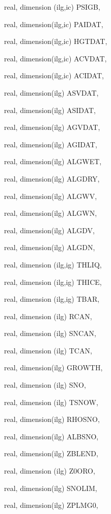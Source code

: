{\begin{DoxyParamCaption}
\item[{real, dimension (ilg,ic)}]{P\+S\+I\+G\+B, }
\item[{real, dimension(ilg,ic)}]{P\+A\+I\+D\+A\+T, }
\item[{real, dimension(ilg,ic)}]{H\+G\+T\+D\+A\+T, }
\item[{real, dimension(ilg,ic)}]{A\+C\+V\+D\+A\+T, }
\item[{real, dimension(ilg,ic)}]{A\+C\+I\+D\+A\+T, }
\item[{real, dimension(ilg)}]{A\+S\+V\+D\+A\+T, }
\item[{real, dimension(ilg)}]{A\+S\+I\+D\+A\+T, }
\item[{real, dimension(ilg)}]{A\+G\+V\+D\+A\+T, }
\item[{real, dimension(ilg)}]{A\+G\+I\+D\+A\+T, }
\item[{real, dimension(ilg)}]{A\+L\+G\+W\+E\+T, }
\item[{real, dimension(ilg)}]{A\+L\+G\+D\+R\+Y, }
\item[{real, dimension(ilg)}]{A\+L\+G\+W\+V, }
\item[{real, dimension(ilg)}]{A\+L\+G\+W\+N, }
\item[{real, dimension(ilg)}]{A\+L\+G\+D\+V, }
\item[{real, dimension(ilg)}]{A\+L\+G\+D\+N, }
\item[{real, dimension (ilg,ig)}]{T\+H\+L\+I\+Q, }
\item[{real, dimension (ilg,ig)}]{T\+H\+I\+C\+E, }
\item[{real, dimension  (ilg,ig)}]{T\+B\+A\+R, }
\item[{real, dimension  (ilg)}]{R\+C\+A\+N, }
\item[{real, dimension (ilg)}]{S\+N\+C\+A\+N, }
\item[{real, dimension  (ilg)}]{T\+C\+A\+N, }
\item[{real, dimension(ilg)}]{G\+R\+O\+W\+T\+H, }
\item[{real, dimension   (ilg)}]{S\+N\+O, }
\item[{real, dimension (ilg)}]{T\+S\+N\+O\+W, }
\item[{real, dimension(ilg)}]{R\+H\+O\+S\+N\+O, }
\item[{real, dimension(ilg)}]{A\+L\+B\+S\+N\+O, }
\item[{real, dimension(ilg)}]{Z\+B\+L\+E\+N\+D, }
\item[{real, dimension (ilg)}]{Z0\+O\+R\+O, }
\item[{real, dimension(ilg)}]{S\+N\+O\+L\+I\+M, }
\item[{real, dimension(ilg)}]{Z\+P\+L\+M\+G0, }

\end{DoxyParamCaption}}
